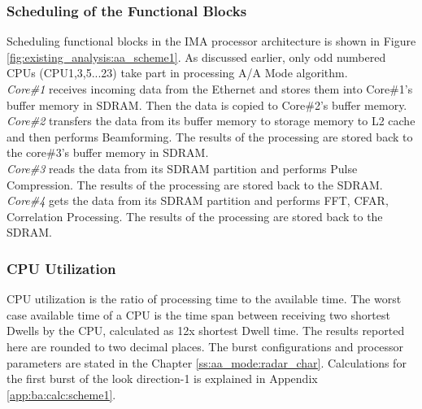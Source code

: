 \subsubsection{Scheduling of the Functional Blocks}
\label{sss:scheme1:aa:sched_blocks}
Scheduling functional blocks in the IMA processor architecture is shown in Figure \ref{fig:existing_analysis:aa_scheme1}. As discussed earlier, only odd numbered CPUs (CPU1,3,5...23) take part in processing A/A Mode algorithm.\\[0.3cm]
\textsl{Core\#1} receives incoming data from the Ethernet and stores them into Core\#1's buffer memory in SDRAM. Then the data is copied to Core\#2's buffer memory.\\[0.2cm]
\textsl{Core\#2} transfers the data from its buffer memory to storage memory to L2 cache and then performs Beamforming. The results of the processing are stored back to the core\#3's buffer memory in SDRAM.\\[0.2cm]
\textsl{Core\#3} reads the data from its SDRAM partition and performs Pulse Compression. The results of the processing are stored back to the SDRAM.\\[0.2cm]
\textsl{Core\#4} gets the data from its SDRAM partition and performs FFT, CFAR, Correlation Processing. The results of the processing are stored back to the SDRAM.

\subsubsection{CPU Utilization}
\label{sss:scheme1:aa:cpu_util}
CPU utilization is the ratio of processing time to the available time. The worst case available time of a CPU is the time span between receiving two shortest Dwells by the CPU, calculated as 12x shortest Dwell time. The results reported here are rounded to two decimal places. The burst configurations and processor parameters are stated in the Chapter \ref{ss:aa_mode:radar_char}. Calculations for the first burst of the look direction-1 is explained in Appendix \ref{app:ba:calc:scheme1}. 

